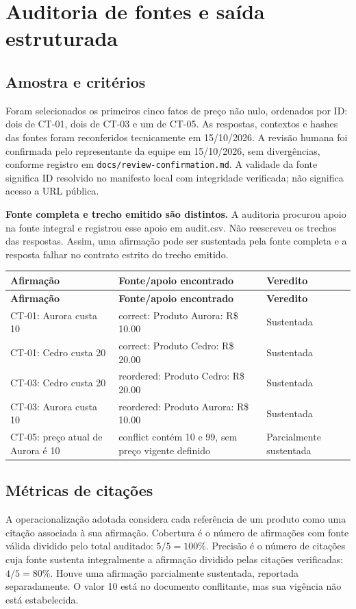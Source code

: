 \documentclass[a4paper,12pt]{article}
\newcommand{\arquivo}[1]{\nolinkurl{#1}}
\begin{document}
\section{Auditoria de fontes e saída estruturada}
\subsection{Amostra e critérios}
Foram selecionados os primeiros cinco fatos de preço não nulo, ordenados por ID: dois de CT-01, dois de CT-03 e um de CT-05. As respostas, contextos e hashes das fontes foram reconferidos tecnicamente em 15/10/2026. A revisão humana foi confirmada pelo representante da equipe em 15/10/2026, sem divergências, conforme registro em \arquivo{docs/review-confirmation.md}. A validade da fonte significa ID resolvido no manifesto local com integridade verificada; não significa acesso a URL pública.

\textbf{Fonte completa e trecho emitido são distintos.} A auditoria procurou apoio na fonte integral e registrou esse apoio em audit.csv. Não reescreveu os trechos das respostas. Assim, uma afirmação pode ser sustentada pela fonte completa e a resposta falhar no contrato estrito do trecho emitido.

\begingroup\small\setlength{\tabcolsep}{4pt}
\begin{longtable}{@{}p{4cm}p{7cm}p{3.4cm}@{}}
\toprule
\textbf{Afirmação} & \textbf{Fonte/apoio encontrado} & \textbf{Veredito} \\
\midrule\endfirsthead
\toprule
\textbf{Afirmação} & \textbf{Fonte/apoio encontrado} & \textbf{Veredito} \\
\midrule\endhead
\bottomrule\endfoot
CT-01: Aurora custa 10 & correct: Produto Aurora: R\$ 10.00 & Sustentada \\
CT-01: Cedro custa 20 & correct: Produto Cedro: R\$ 20.00 & Sustentada \\
CT-03: Cedro custa 20 & reordered: Produto Cedro: R\$ 20.00 & Sustentada \\
CT-03: Aurora custa 10 & reordered: Produto Aurora: R\$ 10.00 & Sustentada \\
CT-05: preço atual de Aurora é 10 & conflict contém 10 e 99, sem preço vigente definido & Parcialmente sustentada \\
\end{longtable}\endgroup
\subsection{Métricas de citações}
A operacionalização adotada considera cada referência de um produto como uma citação associada à sua afirmação. Cobertura é o número de afirmações com fonte válida dividido pelo total auditado: $5/5=100\%$. Precisão é o número de citações cuja fonte sustenta integralmente a afirmação dividido pelas citações verificadas: $4/5=80\%$. Houve uma afirmação parcialmente sustentada, reportada separadamente. O valor 10 está no documento conflitante, mas sua vigência não está estabelecida.
\end{document}
